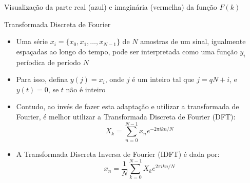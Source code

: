 \begin{frame}[fragile]{Visualização da parte real (azul) e imaginária (vermelha) da função $F(k)$}

    \begin{figure}
        \centering

    \end{figure}

\end{frame}

\begin{frame}[fragile]{Transformada Discreta de Fourier}

    \begin{itemize}
        \item Uma série $x_i = \{ x_0, x_1, \ldots, x_{N - 1}\}$ de $N$ amostras de um sinal,
            igualmente espaçadas ao longo do tempo,
            pode ser interpretada como uma função $y_i$ períodica de período $N$

        \item Para isso, defina $y(j) = x_i$, onde $j$ é um inteiro tal que $j = qN + i$, e
            $y(t) = 0$, se $t$ não é inteiro

        \item Contudo, ao invés de fazer esta adaptação e utilizar a transformada de Fourier, é
            melhor utilizar a Transformada Discreta de Fourier (DFT):
        \[
            X_k = \sum_{n = 0}^{N - 1} x_ne^{-2\pi ikn/N}
        \]

        \item A Transformada Discreta Inversa de Fourier (IDFT) é dada por:
        \[
            x_n = \frac{1}{N}\sum_{k = 0}^{N - 1} X_ke^{2\pi ikn/N}
        \]

    \end{itemize}

\end{frame}


